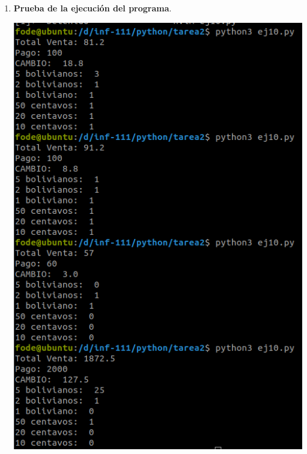 \begin{enumerate}
\begin{enumerate}[\bfseries a)]
    \item \textbf{Prueba de la ejecución del programa}.\\
	\begin{center}
	    \includegraphics[scale=.7]{imagenes/tarea2/ej10.png}
	\end{center}

\end{enumerate}

\newpage
\end{enumerate}
